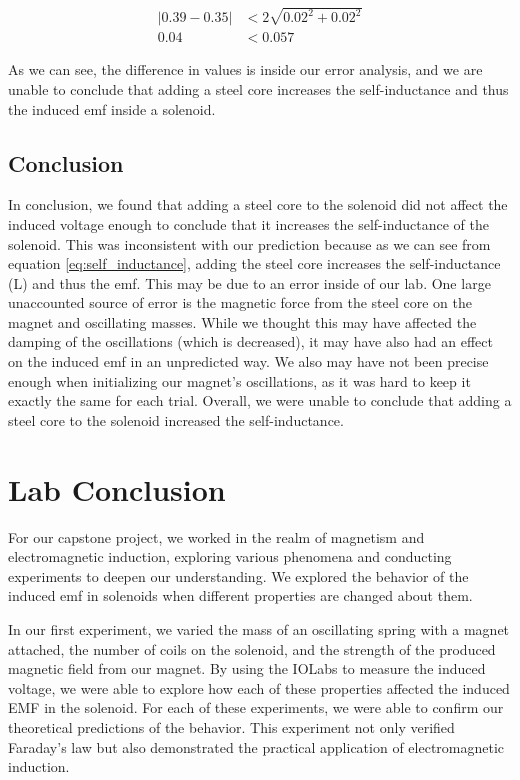\documentclass[11pt]{article}
\let\oldsection\section
\renewcommand\section{\clearpage\oldsection}
\begin{document}
    \begin{align*}
        |0.39 - 0.35| &< 2 \sqrt{0.02^2 + 0.02^2} \\
        0.04 &< 0.057
    \end{align*}

    As we can see, the difference in values is inside our error analysis, and we are unable to conclude that adding a steel core increases the self-inductance and thus the induced emf inside a solenoid.

    
    \subsection{Conclusion}\label{subsec:part_3_conclusion}
    In conclusion, we found that adding a steel core to the solenoid did not affect the induced voltage enough to conclude that it increases the self-inductance of the solenoid. This was inconsistent with our prediction because as we can see from equation \ref{eq:self_inductance}, adding the steel core increases the self-inductance (L) and thus the emf. This may be due to an error inside of our lab. One large unaccounted source of error is the magnetic force from the steel core on the magnet and oscillating masses. While we thought this may have affected the damping of the oscillations (which is decreased), it may have also had an effect on the induced emf in an unpredicted way. We also may have not been precise enough when initializing our magnet's oscillations, as it was hard to keep it exactly the same for each trial. Overall, we were unable to conclude that adding a steel core to the solenoid increased the self-inductance.

    \section{Lab Conclusion}\label{sec:lab_conclusion}
    For our capstone project, we worked in the realm of magnetism and electromagnetic induction, exploring various phenomena and conducting experiments to deepen our understanding. We explored the behavior of the induced emf in solenoids when different properties are changed about them.

    In our first experiment, we varied the mass of an oscillating spring with a magnet attached, the number of coils on the solenoid, and the strength of the produced magnetic field from our magnet. By using the IOLabs to measure the induced voltage, we were able to explore how each of these properties affected the induced EMF in the solenoid. For each of these experiments, we were able to confirm our theoretical predictions of the behavior. This experiment not only verified Faraday’s law but also demonstrated the practical application of electromagnetic induction.
\end{document}
